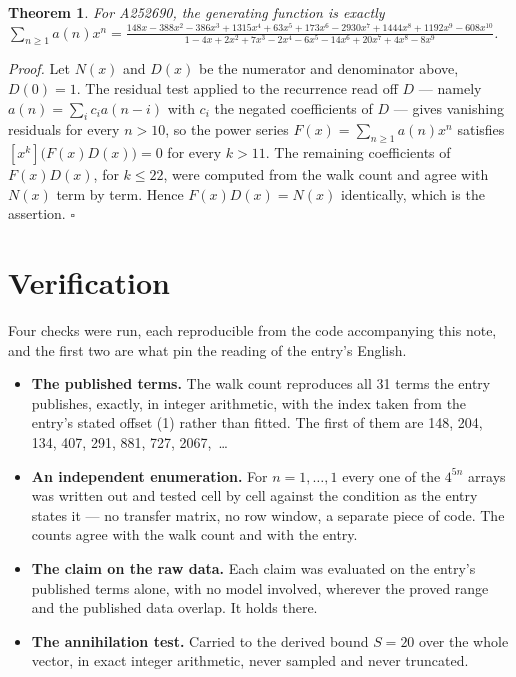 \documentclass[11pt]{article}
\newtheorem{theorem}{Theorem}
\theoremstyle{definition}
\begin{document}
\begin{theorem} For A252690, the generating function is exactly $\sum_{n\ge 1} a(n)x^n = \frac{148x - 388x^{2} - 386x^{3} + 1315x^{4} + 63x^{5} + 173x^{6} - 2930x^{7} + 1444x^{8} + 1192x^{9} - 608x^{10}}{1 - 4x + 2x^{2} + 7x^{3} - 2x^{4} - 6x^{5} - 14x^{6} + 20x^{7} + 4x^{8} - 8x^{9}}$.\end{theorem}

{\itshape Proof.} Let $N(x)$ and $D(x)$ be the numerator and denominator above, $D(0)=1$. The residual test applied to the recurrence read off $D$ --- namely $a(n) = \sum_i c_i a(n-i)$ with $c_i$ the negated coefficients of $D$ --- gives vanishing residuals for every $n > 10$, so the power series $F(x)=\sum_{n\ge 1}a(n)x^n$ satisfies $[x^k]\bigl(F(x)D(x)\bigr) = 0$ for every $k > 11$. The remaining coefficients of $F(x)D(x)$, for $k \le 22$, were computed from the walk count and agree with $N(x)$ term by term. Hence $F(x)D(x) = N(x)$ identically, which is the assertion. $\square$

\section{Verification}

Four checks were run, each reproducible from the code accompanying this note, and the first two are what pin the reading of the entry's English.

\begin{itemize}

\item {\bfseries The published terms.} The walk count reproduces all 31 terms the entry publishes, exactly, in integer arithmetic, with the index taken from the entry's stated offset (1) rather than fitted. The first of them are 148, 204, 134, 407, 291, 881, 727, 2067,~\dots

\item {\bfseries An independent enumeration.} For $n = 1,\dots,1$ every one of the $4^{5n}$ arrays was written out and tested cell by cell against the condition as the entry states it --- no transfer matrix, no row window, a separate piece of code. The counts agree with the walk count and with the entry.

\item {\bfseries The claim on the raw data.} Each claim was evaluated on the entry's published terms alone, with no model involved, wherever the proved range and the published data overlap. It holds there.

\item {\bfseries The annihilation test.} Carried to the derived bound $S = 20$ over the whole vector, in exact integer arithmetic, never sampled and never truncated.

\end{itemize}
\end{document}
